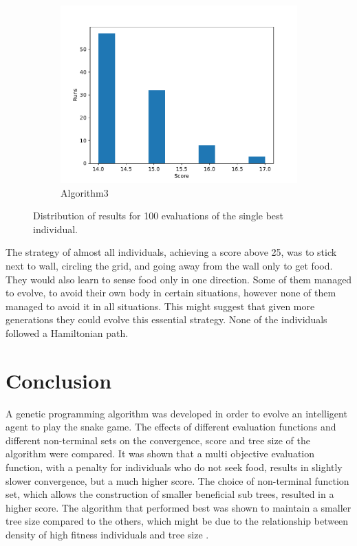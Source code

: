 \documentclass[12pt,a4paper]{article}
\begin{document}
\begin{figure}[h!]
\begin{subfigure}{.33\textwidth}
				\includegraphics[width=\linewidth]{../code/plots/alg3_best_dist}
				\caption{Algorithm3}
				\label{fig:alg3_best_dist}
			\end{subfigure}
			
			\caption{Distribution of results for 100 evaluations of the single best individual.}
			\label{fig:best_dist}
		\end{figure}
		
		The strategy of almost all individuals, achieving a score above 25, was to stick next to wall, circling the grid, and going away from the wall only to get food. They would also learn to sense food only in one direction. Some of them managed to evolve, to avoid their own body in certain situations, however none of them managed to avoid it in all situations. This might suggest that given more generations they could evolve this essential strategy. None of the individuals followed a Hamiltonian path. 
		

		

	\section{Conclusion} \label{conclusions}
	A genetic programming algorithm was developed in order to evolve an intelligent agent to play the snake game. The effects of different evaluation functions and different non-terminal sets on the convergence, score and tree size of the algorithm were compared. It was shown that a multi objective evaluation function, with a penalty for individuals who do not seek food, results in slightly slower convergence, but a much higher score. The choice of non-terminal function set, which allows the construction of smaller beneficial sub trees, resulted in a higher score.	The algorithm that performed best was shown to maintain a smaller tree size compared to the others, which might be due to the relationship between density of high fitness individuals and tree size \cite{langdon_why_1998}.
	
\end{document}
